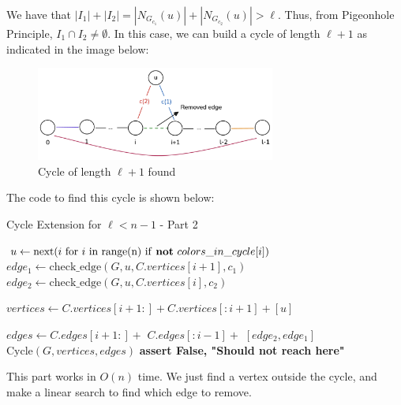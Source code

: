 We have that $|I_1| + |I_2| = |N_{G_{c_1}}(u)| + |N_{G_{c_2}}(u)| > \ell$. Thus, 
from Pigeonhole Principle, $I_1 \cap I_2 \neq \emptyset$. In this case, we can build a cycle of length $\ell + 1$
as indicated in the image below:

\begin{figure}[H]
    \centering
    \includegraphics[width=0.7\textwidth]{figuras/cycle_cycle_extension.png}
    \caption{Cycle of length \( \ell + 1 \) found}
    \label{fig:cycle_cycle_extension}
\end{figure}

The code to find this cycle is shown below:

\begin{algorithm}[H]
    \caption{Cycle Extension for \( \ell < n - 1 \) - Part 2}
    \begin{algorithmic}
            \State $u \gets \text{next}(i \text{ for } i \text{ in range(n) if \textbf{not} } colors\_in\_cycle[i])$
                \State $edge_1 \gets \text{check\_edge}(G, u, C.vertices[i + 1], c_1)$
                \State $edge_2 \gets \text{check\_edge}(G, u, C.vertices[i], c_2)$
                
                    \State $vertices \gets C.vertices[i + 1:] + C.vertices[:i + 1] + [u]$

                    \State $edges \gets C.edges[i + 1:] +$
                    \State \hspace{3.4em} $C.edges[:i - 1] +$
                    \State \hspace{3.4em} $[edge_2, edge_1]$
                    \State \Return $\text{Cycle}(G, vertices, edges)$
                \EndIf
            \EndFor
            \State \textbf{assert False, "Should not reach here"}
        \EndFunction
    \end{algorithmic}
\end{algorithm}

This part works in $O(n)$ time. We just find a vertex outside the cycle,
and make a linear search to find which edge to remove.

